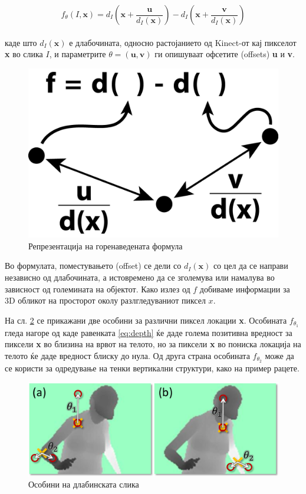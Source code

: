 \documentclass[12pt]{article}
\begin{document}
  \begin{equation} \label{eq:depth}
	  f_\theta(I,\textbf{x}) = d_I(\textbf{x}+\frac{\textbf{u}}{d_I(\textbf{x})}) - d_I(\textbf{x}+\frac{\textbf{v}}{d_I(\textbf{x})})
    \end{equation}
  \\
  каде што $d_I(\textbf{x})$ е длабочината, односно растојанието од Kinect-от кај пикселот \textbf{x} во слика $I$, и параметрите $\theta = (\textbf{u},\textbf{v})$ ги опишуваат офсетите (offsets) \textbf{u} и \textbf{v}.

  \begin{figure}[H]
	  \includegraphics[width=0.35\linewidth]{./images/kinectfeature.png}
		\centering
		\caption{Репрезентација на горенаведената формула}
		\label{fig:kinectfeature.png}
	  \end{figure}

	Во формулата, поместувањето (offset) се дели со $d_I(\textbf{x})$ со цел да се направи независно од длабочината, а истовремено да се зголемува или намалува во зависност од големината на објектот. Како излез од $f$ добиваме информации за 3D обликот на просторот околу разлгледуваниот пиксел $x$.\bigbreak

  На сл. \ref{fig:depth_features.png} се прикажани две особини за различни пиксел локации \textbf{x}. Особината $f_{\theta_1}$ гледа нагоре од каде равенката \ref{eq:depth} ќе даде голема позитивна вредност за пиксели \textbf{x} во близина на врвот на телото, но за пиксели \textbf{x} во пониска локација на телото ќе даде вредност блиску до нула. Од друга страна особината $f_{\theta_2}$ може да се користи за одредување на тенки вертикални структури, како на пример рацете.

  \begin{figure}[H]
    \includegraphics[width=0.75\linewidth]{./images/depth_features.png}
    \centering
    \caption{Особини на длабинската слика}
    \label{fig:depth_features.png}
    \end{figure}
\end{document}
